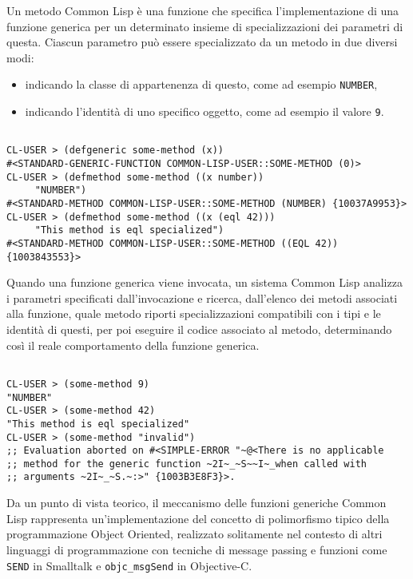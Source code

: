 Un metodo Common Lisp è una funzione che specifica l’implementazione di una
funzione generica per un determinato insieme di specializzazioni dei parametri
di questa. Ciascun parametro può essere specializzato da un metodo in due
diversi modi:

\begin{itemize}

\item indicando la classe di appartenenza di questo, come ad esempio
\texttt{NUMBER},

\item indicando l’identità di uno specifico oggetto, come ad esempio il valore
\texttt{9}.

\end{itemize}

\begin{lstlisting}[caption=Esempi definizione di metodi Common Lisp]

CL-USER > (defgeneric some-method (x))
#<STANDARD-GENERIC-FUNCTION COMMON-LISP-USER::SOME-METHOD (0)>
CL-USER > (defmethod some-method ((x number))
     "NUMBER")
#<STANDARD-METHOD COMMON-LISP-USER::SOME-METHOD (NUMBER) {10037A9953}>
CL-USER > (defmethod some-method ((x (eql 42)))
     "This method is eql specialized")
#<STANDARD-METHOD COMMON-LISP-USER::SOME-METHOD ((EQL 42)) {1003843553}>

\end{lstlisting}

Quando una funzione generica viene invocata, un sistema Common Lisp analizza i
parametri specificati dall'invocazione e ricerca, dall’elenco dei metodi
associati alla funzione, quale metodo riporti specializzazioni compatibili con i
tipi e le identità di questi, per poi eseguire il codice associato al metodo,
determinando così il reale comportamento della funzione generica.

\begin{lstlisting}[caption=Esempi di invocazione di metodi Common Lisp]

CL-USER > (some-method 9)
"NUMBER"
CL-USER > (some-method 42)
"This method is eql specialized"
CL-USER > (some-method "invalid")
;; Evaluation aborted on #<SIMPLE-ERROR "~@<There is no applicable
;; method for the generic function ~2I~_~S~~I~_when called with
;; arguments ~2I~_~S.~:>" {1003B3E8F3}>.

\end{lstlisting}

Da un punto di vista teorico, il meccanismo delle funzioni generiche Common Lisp
rappresenta un’implementazione del concetto di polimorfismo tipico della
programmazione Object Oriented, realizzato solitamente nel contesto di altri
linguaggi di programmazione con tecniche di message passing e funzioni come
\texttt{SEND} in Smalltalk e \texttt{objc\_msgSend} in Objective-C.\\

